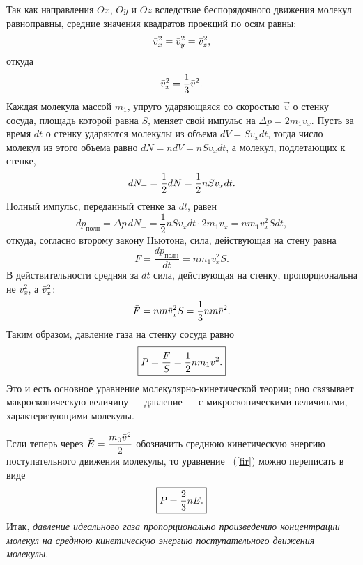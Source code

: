 	Так как направления $Ox$, $Oy$ и $Oz$ вследствие беспорядочного движения молекул равноправны, средние значения квадратов проекций по осям равны:
		$$\bar v_x^2=\bar v_y^2=\bar v_z^2,$$
	откуда
		$$\bar v_x^2=\frac{1}{3}\bar v^2.$$
	Каждая молекула массой $m_1$, упруго ударяющаяся со скоростью $\vec{v}$ о стенку сосуда, площадь которой равна $S$, меняет свой импульс на $\Delta p = 2m_1v_x$. Пусть за время $dt$ о стенку ударяются молекулы из объема $dV=Sv_xdt$, тогда число молекул из этого объема равно $dN=ndV=nSv_xdt$, а молекул, подлетающих к стенке, --- 
		$$dN_+ \hm=\dfrac{1}{2}dN=\dfrac{1}{2}nSv_xdt.$$
	Полный импульс, переданный стенке за $dt$,  равен 
		$$dp_{\text{полн}}=\Delta p\,dN_+=\frac{1}{2}nSv_xdt \cdot 2m_1v_x=nm_1v_x^2Sdt,$$
	откуда, согласно второму закону Ньютона, сила, действующая на стену равна
		$$F=\frac{dp_{\text{полн}}}{dt}=nm_1v_x^2S.$$
	В действительности средняя за $dt$ сила, действующая на стенку, пропорциональна не $v_x^2$, а $\bar v_x^2$:
		$$\bar F=nm\bar v_x^2S=\frac{1}{3}nm\bar v^2.$$
	Таким образом, давление газа на стенку сосуда равно
	\begin{equation}\label{fir}
		\boxed{P=\frac{\bar F}{S}=\frac{1}{2}nm_1\bar v^2.}
	\end{equation}
	Это и есть основное уравнение молекулярно-кинетической теории; оно связывает макроскопическую величину --- давление --- с микроскопическими величинами, характеризующими молекулы. \par
	Если теперь через $\bar E=\dfrac{m_0\bar v^2}{2}$ обозначить среднюю кинетическую энергию поступательного движения молекулы, то уравнение ~(\ref{fir}) можно переписать в виде
	\begin{equation}\label{sec}
		\boxed{P=\frac{2}{3}n\bar E.}
	\end{equation}
	Итак, \textit{давление идеального газа пропорционально произведению концентрации молекул на среднюю кинетическую энергию поступательного движения молекулы}.